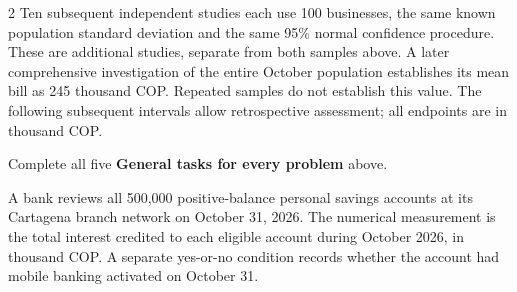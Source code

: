 \begin{multicols}{2}
Ten subsequent independent studies each use 100 businesses, the same known population standard deviation and the same 95\% normal confidence procedure. These are additional studies, separate from both samples above. A later comprehensive investigation of the entire October population establishes its mean bill as 245 thousand COP. Repeated samples do not establish this value. The following subsequent intervals allow retrospective assessment; all endpoints are in thousand COP.

\par\noindent\begin{minipage}{\linewidth}
\begin{minipage}[t]{.49\linewidth}
\end{minipage}\hfill
\begin{minipage}[t]{.49\linewidth}
\end{minipage}
\end{minipage}\par

\par\smallskip
Complete all five \textbf{General tasks for every problem} above.
\endgroup

\columnbreak


A bank reviews all 500,000 positive-balance personal savings accounts at its Cartagena branch network on October 31, 2026. The numerical measurement is the total interest credited to each eligible account during October 2026, in thousand COP. A separate yes-or-no condition records whether the account had mobile banking activated on October 31.


\end{multicols}
